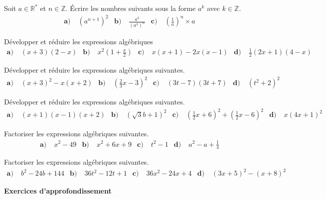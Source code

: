 \documentclass[11pt]{article}
\begin{document}
\begin{exo}
 Soit $a\in\mathbb{R}^*$ et $n\in\mathbb{Z}$. Écrire les nombres suivants sous
 la forme $a^k$ avec $k\in\mathbb{Z}$.
\begin{align*}
  \textbf{a)}\;& \left( a^{n+1} \right)^2 &
  \textbf{b)}\;& \frac{a^4}{(a^3)^n} &
  \textbf{c)}\;& \left( \frac{1}{a} \right)^n\times a
\end{align*}
\end{exo}

\begin{exo}
Développer et réduire les expressions algébriques
\begin{align*}
  \textbf{a)}\;& (x+3)(2-x) &
  \textbf{b)}\;& x^2\left( 1+\frac{x}{2} \right) &
  \textbf{c)}\;& x(x+1)-2x(x-1) &
  \textbf{d)}\;& \frac{1}{2}\left( 2x+1 \right)\left( 4-x \right)
\end{align*}
\end{exo}

\begin{exo}
Développer et réduire les expressions algébriques suivantes.
\begin{align*}
  \textbf{a)}\;& (x+3)^2-x(x+2) &
  \textbf{b)}\;& \left(\frac{2}{3}x-3\right)^2 &
  \textbf{c)}\;& (3t-7)(3t+7) &
  \textbf{d)}\;& (t^2+2)^2
\end{align*}
\end{exo}

\begin{exo}
Développer et réduire les expressions algébriques suivantes.
\begin{align*}
  \textbf{a)}\;& (x+1)(x-1)(x+2) &
  \textbf{b)}\;& \left( \sqrt3b+1 \right)^2 &
  \textbf{c)}\;& \left( \frac{1}{2}x+6 \right)^2+\left( \frac{1}{2}x -6\right)^2
  &
  \textbf{d)}\;& x(4x+1)^2
\end{align*}
\end{exo}

\begin{exo}
Factoriser les expressions algébriques suivantes.
\begin{align*}
  \textbf{a)}\;& x^2-49 &
  \textbf{b)}\;& x^2+6x+9 &
  \textbf{c)}\;& t^2-1 &
  \textbf{d)}\;& a^2-a+\frac{1}{4}
\end{align*}
\end{exo}

\begin{exo}
Factoriser les expressions algébriques suivantes.
\begin{align*}
  \textbf{a)}\;& b^2-24b+144 &
  \textbf{b)}\;& 36t^2-12t+1 &
  \textbf{c)}\;& 36x^2-24x+4 &
  \textbf{d)}\;& (3x+5)^2-(x+8)^2
\end{align*}
\begin{center}
  \LARGE \textbf{Exercices d'approfondissement}
\end{center}
\end{exo}
\end{document}
